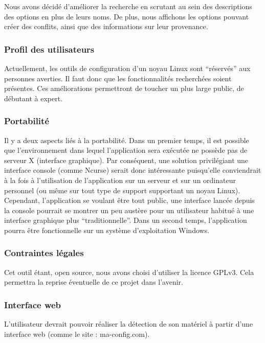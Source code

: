 \documentclass[16pts]{report}
\begin{document}
Nous avons décidé d’améliorer la recherche en scrutant au sein des descriptions
des options en plus de leurs noms. De plus, nous affichons les options pouvant
créer des conflits, ainsi que des informations sur leur provenance.

\subsubsection{Profil des utilisateurs}
\label{sec:Profil des utilisateurs}
Actuellement, les outils de configuration d’un noyau Linux sont “réservés” aux
personnes averties. Il faut donc que les fonctionnalités recherchées soient
présentes. Ces améliorations permettront de toucher un plus large public, de
débutant à expert.

\subsubsection{Portabilité}
\label{sec:Portabilité}
Il y a deux aspects liés à la portabilité. Dans un premier temps, il est
possible que l’environnement dans lequel l’application sera exécutée ne possède
pas de serveur X (interface graphique). Par conséquent, une solution
privilégiant une interface console (comme Ncurse) serait donc intéressante
puisqu’elle conviendrait à la fois à l’utilisation de l’application sur un
serveur et sur un ordinateur personnel (ou même sur tout type de support
supportant un noyau Linux). Cependant, l’application se voulant être tout
public, une interface lancée depuis la console pourrait se montrer un peu
austère pour un utilisateur habitué à une interface graphique plus
“traditionnelle”.  Dans un second temps, l’application pourra être
fonctionnelle sur un système d’exploitation Windows.

\subsubsection{Contraintes légales}
\label{sec:Contraintes légales}
Cet outil étant, open source, nous avons choisi d’utiliser la licence GPLv3.
Cela permettra la reprise éventuelle de ce projet dans l’avenir.

\subsubsection{Interface web}
\label{sec:Interface web}
L’utilisateur devrait pouvoir réaliser la détection de son matériel à partir
d’une interface web (comme le site : ma-config.com).
\end{document}
